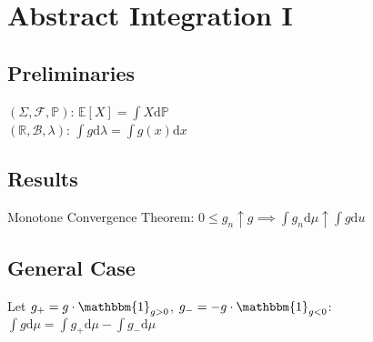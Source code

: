 \section{Abstract Integration I}
	\subsection*{Preliminaries}
	$\left(\Sigma, \mathcal{F}, \mathbb{P}\right)$: $\mathbb{E}\left[X\right] = \int\!X\mathrm{d}\mathbb{P}$\\
	$\left(\mathbb{R}, \mathcal{B}, \lambda\right)$: $\int\!g\mathrm{d}\lambda = \int\!g(x)\mathrm{d}x$
	
	\subsection*{Results}
	Monotone Convergence Theorem: $0\leq g_{n}\uparrow g\implies\int\!g_{n}\mathrm{d}\mu\uparrow\int\!g\mathrm{d}u$
	
	\subsection*{General Case}
	Let $g_{+} = g\cdot\mathbbm{1}_{g > 0}$, $g_{-} = -g\cdot\mathbbm{1}_{g < 0}$:\\
	$\int\!g\mathrm{d}\mu = \int\!g_{+}\mathrm{d}\mu - \int\!g_{-}\mathrm{d}\mu$
	